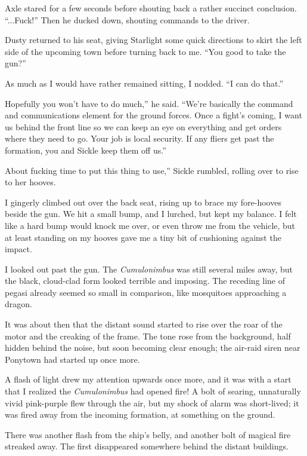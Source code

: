 Axle stared for a few seconds before shouting back a rather succinct conclusion. “...Fuck!” Then he ducked down, shouting commands to the driver.

Dusty returned to his seat, giving Starlight some quick directions to skirt the left side of the upcoming town before turning back to me. “You good to take the gun?”

As much as I would have rather remained sitting, I nodded. “I can do that.”

\leavevmode{}Hopefully you won’t have to do much,” he said. “We’re basically the command and communications element for the ground forces. Once a fight’s coming, I want us behind the front line so we can keep an eye on everything and get orders where they need to go. Your job is local security. If any fliers get past the formation, you and Sickle keep them off us.”

\leavevmode{}About fucking time to put this thing to use,” Sickle rumbled, rolling over to rise to her hooves.

I gingerly climbed out over the back seat, rising up to brace my fore-hooves beside the gun. We hit a small bump, and I lurched, but kept my balance. I felt like a hard bump would knock me over, or even throw me from the vehicle, but at least standing on my hooves gave me a tiny bit of cushioning against the impact.

I looked out past the gun. The \textit{Cumulonimbus} was still several miles away, but the black, cloud-clad form looked terrible and imposing. The receding line of pegasi already seemed so small in comparison, like mosquitoes approaching a dragon.

It was about then that the distant sound started to rise over the roar of the motor and the creaking of the frame. The tone rose from the background, half hidden behind the noise, but soon becoming clear enough; the air-raid siren near Ponytown had started up once more.

A flash of light drew my attention upwards once more, and it was with a start that I realized the \textit{Cumulonimbus} had opened fire! A bolt of searing, unnaturally vivid pink-purple flew through the air, but my shock of alarm was short-lived; it was fired away from the incoming formation, at something on the ground.

There was another flash from the ship’s belly, and another bolt of magical fire streaked away. The first disappeared somewhere behind the distant buildings.

